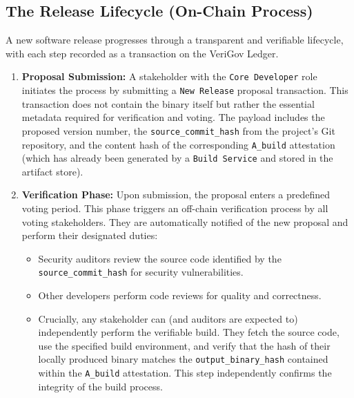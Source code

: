 \documentclass{article}
\begin{document}
\subsection{The Release Lifecycle (On-Chain Process)}

A new software release progresses through a transparent and verifiable lifecycle, with each step recorded as a transaction on the VeriGov Ledger.

\begin{enumerate}
\item \textbf{Proposal Submission:} A stakeholder with the \lstinline{Core Developer} role initiates the process by submitting a \lstinline{New Release} proposal transaction. This transaction does not contain the binary itself but rather the essential metadata required for verification and voting. The payload includes the proposed version number, the \lstinline{source_commit_hash} from the project's Git repository, and the content hash of the corresponding \lstinline{A_build} attestation (which has already been generated by a \lstinline{Build Service} and stored in the artifact store).
\item \textbf{Verification Phase:} Upon submission, the proposal enters a predefined voting period. This phase triggers an off-chain verification process by all voting stakeholders. They are automatically notified of the new proposal and perform their designated duties:

\begin{itemize}
\item Security auditors review the source code identified by the \lstinline{source_commit_hash} for security vulnerabilities.
\item Other developers perform code reviews for quality and correctness.
\item Crucially, any stakeholder can (and auditors are expected to) independently perform the verifiable build. They fetch the source code, use the specified build environment, and verify that the hash of their locally produced binary matches the \lstinline{output_binary_hash} contained within the \lstinline{A_build} attestation. This step independently confirms the integrity of the build process.
\end{itemize}
\end{enumerate}
\end{document}
